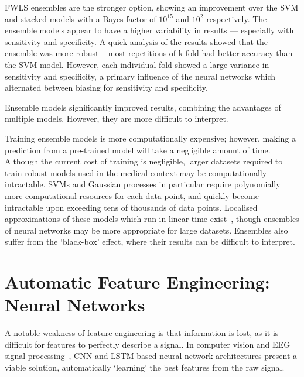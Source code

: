\documentclass[12pt, twoside]{book}
\begin{document}
FWLS ensembles are the stronger option, showing an improvement over the SVM and stacked models with a Bayes factor of $10^{15}$ and $10^2$ respectively. The ensemble models appear to have a higher variability in results --- especially with sensitivity and specificity. A quick analysis of the results showed that the ensemble was more robust -- most repetitions of k-fold had better accuracy than the SVM model. However, each individual fold showed a large variance in sensitivity and specificity, a primary influence of the neural networks which alternated between biasing for sensitivity and specificity. 


\begin{highlight}[Ensembling]
	Ensemble models significantly improved results, combining the advantages of multiple models. However, they are more difficult to interpret.
\end{highlight}

Training ensemble models is more computationally expensive; however, making a prediction from a pre-trained model will take a negligible amount of time. Although the current cost of training is negligible, larger datasets required to train robust models used in the medical context may be computationally intractable. SVMs and Gaussian processes in particular require polynomially more computational resources for each data-point, and quickly become intractable upon exceeding tens of thousands of data points. Localised approximations of these models which run in linear time exist~\cite{coresvm}, though ensembles of neural networks may be more appropriate for large datasets. Ensembles also suffer from the `black-box' effect, where their results can be difficult to interpret.


\newpage
\section{Automatic Feature Engineering: Neural Networks}
\label{automaticfeatureengineering}
A notable weakness of feature engineering is that information is lost, as it is difficult for features to perfectly describe a signal. In computer vision and EEG signal processing~\cite{bashivan2015learning}, CNN and LSTM based neural network architectures present a viable solution, automatically `learning' the best features from the raw signal. 
\end{document}
